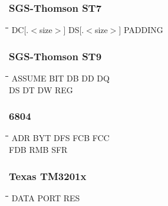 \subsubsection{SGS-Thomson ST7}
{\tt\begin{tabbing}
\hspace{3cm}\=\hspace{3cm}\=\hspace{3cm}\=\hspace{3cm}\=\kill
DC[.$<$size$>$] \> DS[.$<$size$>$]   \> PADDING \\
\end{tabbing}}

\subsubsection{SGS-Thomson ST9}
{\tt\begin{tabbing}
\hspace{3cm}\=\hspace{3cm}\=\hspace{3cm}\=\hspace{3cm}\=\kill
ASSUME     \> BIT         \> DB          \> DD          \> DQ \\
DS         \> DT          \> DW          \> REG \\
\end{tabbing}}

\subsubsection{6804}
{\tt\begin{tabbing}
\hspace{3cm}\=\hspace{3cm}\=\hspace{3cm}\=\hspace{3cm}\=\kill
ADR        \> BYT         \> DFS         \> FCB         \> FCC \\
FDB        \> RMB         \> SFR \\
\end{tabbing}}

\subsubsection{Texas TM3201x}
{\tt\begin{tabbing}
\hspace{3cm}\=\hspace{3cm}\=\hspace{3cm}\=\hspace{3cm}\=\kill
DATA       \> PORT        \> RES \\
\end{tabbing}}


